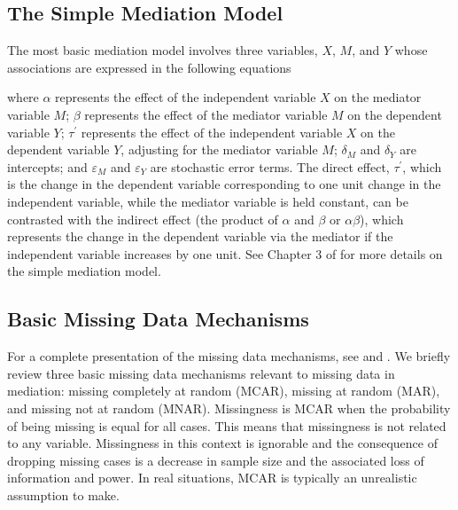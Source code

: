\documentclass[man]{apa7}\usepackage[]{graphicx}\usepackage[]{xcolor}
\begin{document}
\subsection{The Simple Mediation Model}

The most basic mediation model involves three variables,
${X}$, ${M}$, and ${Y}$
whose associations are expressed in the following equations





\noindent where
$\alpha$
represents the effect of the independent variable $X$
on the mediator variable $M$;
$\beta$
represents the effect of the mediator variable $M$ 
on the dependent variable $Y$;
$\tau^{\prime}$
represents the effect of the independent variable $X$
on the dependent variable $Y$,
adjusting for the mediator variable $M$;
$\delta_{M}$
and
$\delta_{Y}$
are intercepts;
and
$\varepsilon_{M}$
and
$\varepsilon_{Y}$
are stochastic error terms.
The direct effect,
$\tau^{\prime}$,
which is
the change in the dependent variable
corresponding to one unit change in the independent variable,
while the mediator variable is held constant,
can be contrasted with
the indirect effect
(the product of $\alpha$
and
$\beta$
or
$\alpha \beta$),
which represents the change in the dependent variable
via the mediator if the independent variable increases by one unit.
See Chapter 3 of
\Textcite{Lib-Mediation-Books-MacKinnon-2008}
for more details on the simple mediation model.

\subsection{Basic Missing Data Mechanisms}

For a complete presentation of the missing data mechanisms,
see
\Textcite{Lib-Missing-Data-Rubin-1976}
and
\Textcite{Lib-Missing-Data-Books-Little-2019}.
We briefly review three basic missing data mechanisms
relevant to missing data in mediation:
missing completely at random (MCAR),
missing at random (MAR),
and missing not at random (MNAR).
Missingness is MCAR when the probability of being missing
is equal for all cases.
This means that missingness is not related to any variable.
Missingness in this context is ignorable
and the consequence of dropping missing cases
is a decrease in sample size and the associated loss of information and power.
In real situations,
MCAR is typically an unrealistic assumption to make.
\end{document}
